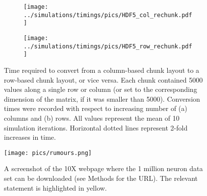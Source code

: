 \documentclass{article}
\begin{document}
\begin{figure}[bt]
    \begin{subfigure}[bt]{0.49\textwidth}
        \texttt{[image: ../simulations/timings/pics/HDF5\_col\_rechunk.pdf]}
        \caption{}
    \end{subfigure}
    \begin{subfigure}[bt]{0.49\textwidth}
        \texttt{[image: ../simulations/timings/pics/HDF5\_row\_rechunk.pdf]}
        \caption{}
    \end{subfigure}
    \caption{Time required to convert from a column-based chunk layout to a row-based chunk layout, or vice versa.
        Each chunk contained 5000 values along a single row or column (or set to the corresponding dimension of the matrix, if it was smaller than 5000).
        Conversion times were recorded with respect to increasing number of (a) columns and (b) rows.
        All values represent the mean of 10 simulation iterations.
        Horizontal dotted lines represent 2-fold increases in time.
    }
    \label{fig:hdf5rechunk}
\end{figure}

\begin{figure}[bt]
    \begin{center}
        \texttt{[image: pics/rumours.png]}
    \end{center}
    \caption{A screenshot of the 10X webpage where the 1 million neuron data set can be downloaded (see Methods for the URL).
    The relevant statement is highlighted in yellow.}
\end{figure}
\end{document}
